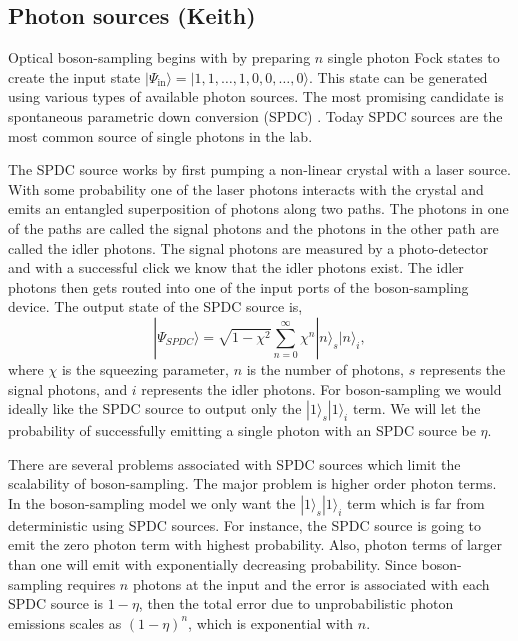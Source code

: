 \documentclass[aps,pra,twocolumn,amsmath,amssymb,nofootinbib,superscriptaddress]{revtex4}
\newcommand{\ket}[1]{|#1\rangle}
\begin{document}
\subsection{Photon sources (Keith)}

Optical boson-sampling begins with by preparing $n$ single photon Fock states to create the input state $\ket{\Psi_{\mathrm{in}}}=\ket{1,1,\dots,1,0,0,\dots,0}$. This state can be generated using various types of available photon sources. The most promising candidate is spontaneous parametric down conversion (SPDC) \cite{}. Today SPDC sources are the most common source of single photons in the lab.

The SPDC source works by first pumping a non-linear crystal with a laser source. With some probability one of the laser photons interacts with the crystal and emits an entangled superposition of photons along two paths. The photons in one of the paths are called the signal photons and the photons in the other path are called the idler photons. The signal photons are measured by a photo-detector and with a successful click we know that the idler photons exist. The idler photons then gets routed into one of the input ports of the boson-sampling device. The output state of the SPDC source is,
\begin{equation} \label{SPDC}
\ket{\Psi_{SPDC}} = \sqrt{1-\chi^2}\sum_{n=0}^{\infty}\chi^n\ket{n}_s\ket{n}_i,
\end{equation}
where $\chi$ is the squeezing parameter, $n$ is the number of photons, $s$ represents the signal photons, and $i$ represents the idler photons. For boson-sampling we would ideally like the SPDC source to output only the $\ket{1}_s\ket{1}_i$ term. We will let the probability of successfully emitting a single photon with an SPDC source be $\eta$.

There are several problems associated with SPDC sources which limit the scalability of boson-sampling. The major problem is higher order photon terms. In the boson-sampling model we only want the $\ket{1}_s\ket{1}_i$ term which is far from deterministic using SPDC sources. For instance, the SPDC source is going to emit the zero photon term with highest probability. Also, photon terms of larger than one will emit with exponentially decreasing probability.  Since boson-sampling requires $n$ photons at the input and the error is associated with each SPDC source is $1-\eta$, then the total error due to unprobabilistic photon emissions scales as $(1-\eta)^{n}$, which is exponential with $n$. 
\end{document}
